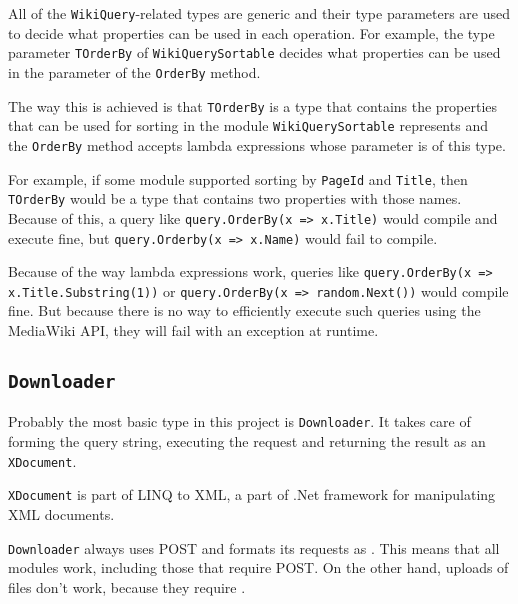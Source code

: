 \medskip
\pagebreak[0]


All of the \lstinline{WikiQuery}-related types are generic
and their type parameters are used to decide what properties can be used in each operation.
For example, the type parameter \lstinline{TOrderBy} of \lstinline{WikiQuerySortable}
decides what properties can be used in the parameter of the \lstinline{OrderBy} method.

The way this is achieved is that \lstinline{TOrderBy} is a type that contains the properties that can be
used for sorting in the module \lstinline{WikiQuerySortable} represents
and the \lstinline{OrderBy} method accepts lambda expressions whose parameter is of this type.

For example, if some module supported sorting by \lstinline{PageId} and \lstinline{Title},
then \lstinline{TOrderBy} would be a type that contains two properties with those names.
Because of this, a query like \lstinline{query.OrderBy(x => x.Title)} would compile and execute fine,
but \lstinline{query.Orderby(x => x.Name)} would fail to compile.

Because of the way lambda expressions work, queries like \lstinline[breaklines=true]{query.OrderBy(x => x.Title.Substring(1))} or \lstinline{query.OrderBy(x => random.Next())} would compile fine.
But because there is no way to efficiently execute such queries using the MediaWiki API,
they will fail with an exception at runtime.


\medskip




\subsection{\texorpdfstring{\lstinline{Downloader}}{Downloader}}

Probably the most basic type in this project is \lstinline{Downloader}.
It takes care of forming the query string, executing the request and
returning the result as an \lstinline{XDocument}.

\lstinline{XDocument} is part of LINQ to XML, a part of .Net framework for manipulating XML documents.

\lstinline{Downloader} always uses POST and formats its requests as .
This means that all modules work, including those that require POST.
On the other hand, uploads of files don't work, because they require .


